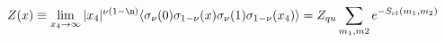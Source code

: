 \begin{equation}
Z(x)\equiv \lim_{x_4\to \infty}  |x_4|^{\nu(1-\n)} \langle
\sigma_\nu(0) \sigma_{1-\nu} (x) \sigma_\nu(1) \sigma_{1-\nu}
(x_4) \rangle =Z_{qu} \sum_{m_1,m2}e^{-S_{cl} (m_1,m_2)} \,
\label{Z}
\end{equation}

